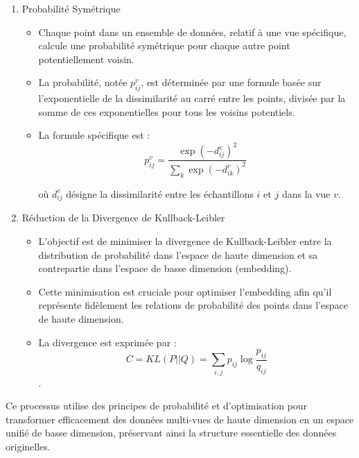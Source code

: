  
        
        \begin{enumerate}
        \item {Probabilité Symétrique}
            \begin{itemize}
                \item Chaque point dans un ensemble de données, relatif à une vue spécifique, calcule une probabilité symétrique pour chaque autre point potentiellement voisin.
                \item La probabilité, notée \( p_{ij}^v \), est déterminée par une formule basée sur l'exponentielle de la dissimilarité au carré entre les points, divisée par la somme de ces exponentielles pour tous les voisins potentiels.
                \item La formule spécifique est : 
                \begin{equation}
                     p_{ij}^v = \frac{\exp{(-d_{ij}^v)^2}}{\sum_{k}{\exp{(-d_{ik}^v)^2}}} \
                \end{equation}
                
                
                où \( d_{ij}^v \) désigne la dissimilarité entre les échantillons \( i \) et \( j \) dans la vue \( v \).
            \end{itemize}
        
        \item {Réduction de la Divergence de Kullback-Leibler}
            \begin{itemize}
                \item L'objectif est de minimiser la divergence de Kullback-Leibler entre la distribution de probabilité dans l'espace de haute dimension et sa contrepartie dans l'espace de basse dimension (embedding).
                \item Cette minimisation est cruciale pour optimiser l'embedding afin qu'il représente fidèlement les relations de probabilité des points dans l'espace de haute dimension.
                \item La divergence est exprimée par :
                \[ C = KL(P || Q) = \sum_{i, j} p_{ij} \log \frac{p_{ij}}{q_{ij}} \].
            \end{itemize}
        \end{enumerate}
    
        Ce processus utilise des principes de probabilité et d'optimisation pour transformer efficacement des données multi-vues de haute dimension en un espace unifié de basse dimension, préservant ainsi la structure essentielle des données originelles.

